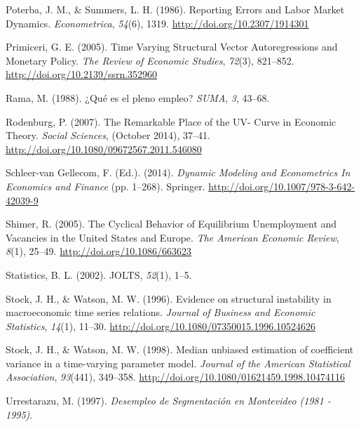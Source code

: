 \documentclass[12pt,twoside]{reedthesis}
\begin{document}
\leavevmode\hypertarget{ref-Poterba1986}{}%
Poterba, J. M., \& Summers, L. H. (1986). Reporting Errors and Labor Market Dynamics. \emph{Econometrica}, \emph{54}(6), 1319. \url{http://doi.org/10.2307/1914301}

\leavevmode\hypertarget{ref-Primiceri2005}{}%
Primiceri, G. E. (2005). Time Varying Structural Vector Autoregressions and Monetary Policy. \emph{The Review of Economic Studies}, \emph{72}(3), 821--852. \url{http://doi.org/10.2139/ssrn.352960}

\leavevmode\hypertarget{ref-Rama1988}{}%
Rama, M. (1988). ¿Qué es el pleno empleo? \emph{SUMA}, \emph{3}, 43--68.

\leavevmode\hypertarget{ref-Rodenburg2007}{}%
Rodenburg, P. (2007). The Remarkable Place of the UV- Curve in Economic Theory. \emph{Social Sciences}, (October 2014), 37--41. \url{http://doi.org/10.1080/09672567.2011.546080}

\leavevmode\hypertarget{ref-Craven2014}{}%
Schleer-van Gellecom, F. (Ed.). (2014). \emph{Dynamic Modeling and Econometrics In Economics and Finance} (pp. 1--268). Springer. \url{http://doi.org/10.1007/978-3-642-42039-9}

\leavevmode\hypertarget{ref-Shimer2005}{}%
Shimer, R. (2005). The Cyclical Behavior of Equilibrium Unemployment and Vacancies in the United States and Europe. \emph{The American Economic Review}, \emph{8}(1), 25--49. \url{http://doi.org/10.1086/663623}

\leavevmode\hypertarget{ref-JOLTS}{}%
Statistics, B. L. (2002). JOLTS, \emph{52}(1), 1--5.

\leavevmode\hypertarget{ref-Stock1996}{}%
Stock, J. H., \& Watson, M. W. (1996). Evidence on structural instability in macroeconomic time series relations. \emph{Journal of Business and Economic Statistics}, \emph{14}(1), 11--30. \url{http://doi.org/10.1080/07350015.1996.10524626}

\leavevmode\hypertarget{ref-Stock1998}{}%
Stock, J. H., \& Watson, M. W. (1998). Median unbiased estimation of coefficient variance in a time-varying parameter model. \emph{Journal of the American Statistical Association}, \emph{93}(441), 349--358. \url{http://doi.org/10.1080/01621459.1998.10474116}

\leavevmode\hypertarget{ref-Urrestarazu1997}{}%
Urrestarazu, M. (1997). \emph{Desempleo de Segmentación en Montevideo (1981 - 1995)}.


\end{document}
